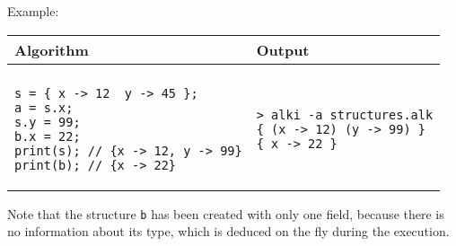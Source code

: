 \documentclass[a4paper]{report}
\begin{document}
Example:
\begin{center}
\begin{tabular}{ll}
Algorithm & Output\\
\hline
\\
\begin{minipage}{.45\textwidth}
\begin{verbatim}
s = { x -> 12  y -> 45 };
a = s.x;
s.y = 99;
b.x = 22;
print(s); // {x -> 12, y -> 99}
print(b); // {x -> 22}
\end{verbatim}
\end{minipage}
&
\begin{minipage}{.45\textwidth}
\begin{verbatim}
> alki -a structures.alk
{ (x -> 12) (y -> 99) }
{ x -> 22 }
\end{verbatim}
\end{minipage}
\end{tabular}
\end{center}
Note that the structure \texttt{b} has been created with only one field, because there is no information about its type, which is deduced on the fly during the execution.
\end{document}
